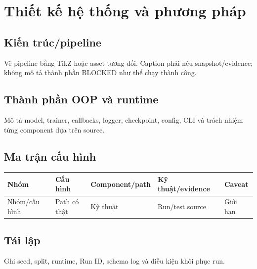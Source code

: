\chapter{Thiết kế hệ thống và phương pháp}
\section{Kiến trúc/pipeline}
Vẽ pipeline bằng TikZ hoặc asset tương đối. Caption phải nêu snapshot/evidence; không mô tả thành phần BLOCKED như thể chạy thành công.
\section{Thành phần OOP và runtime}
Mô tả model, trainer, callbacks, logger, checkpoint, config, CLI và trách nhiệm từng component dựa trên source.
\section{Ma trận cấu hình}
\begin{longtable}{p{}p{}p{}p{}p{}}
\toprule Nhóm & Cấu hình & Component/path & Kỹ thuật/evidence & Caveat \\
\midrule
Nhóm/cấu hình & Path có thật & Kỹ thuật & Run/test source & Giới hạn \\
\bottomrule
\end{longtable}
\section{Tái lập}
Ghi seed, split, runtime, Run ID, schema log và điều kiện khôi phục run.